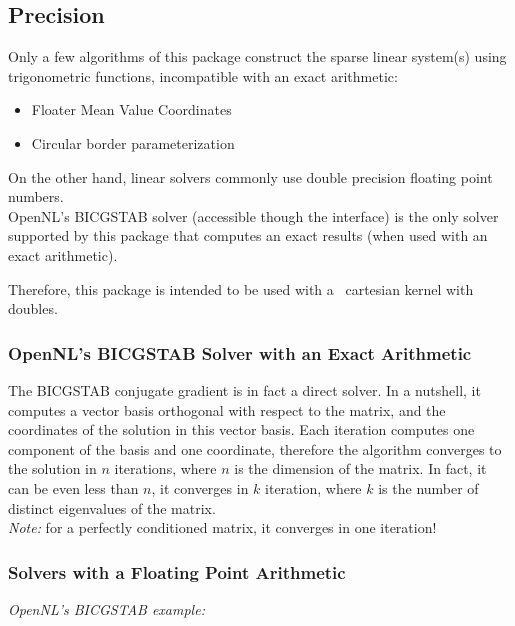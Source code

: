 \subsection{Precision}

Only a few algorithms of this package construct the sparse linear system(s)
using trigonometric functions, incompatible with an exact arithmetic:

\begin{itemize}

\item Floater Mean Value Coordinates

\item Circular border parameterization

\end{itemize}

On the other hand, linear solvers commonly use double precision floating point
numbers. \\
OpenNL's BICGSTAB solver (accessible though the
 interface)
is the only solver supported by this package that
computes an exact results (when used with an exact arithmetic).

Therefore, this package is intended to be used with a \cgal\
cartesian kernel with doubles.


\subsubsection{OpenNL's BICGSTAB Solver with an Exact Arithmetic}

The BICGSTAB conjugate gradient is in fact a direct solver.
In a nutshell, it computes a vector basis
orthogonal with respect to the matrix, and the coordinates of the solution in this vector basis.
Each iteration computes one component of the basis and one coordinate, therefore the algorithm
converges to the solution in $n$ iterations, where $n$ is the dimension of the matrix.
In fact, it can be even less than $n$, it converges in $k$ iteration, where $k$ is the number
of distinct eigenvalues of the matrix. \\
\emph{Note:} for a perfectly conditioned matrix, it converges in one iteration!


\subsubsection{Solvers with a Floating Point Arithmetic}

\emph{OpenNL's BICGSTAB example:}

